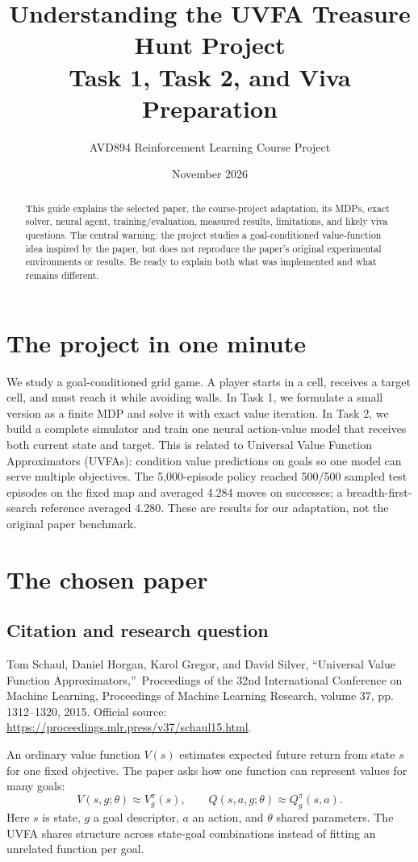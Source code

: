 \documentclass[11pt,a4paper]{article}
\title{Understanding the UVFA Treasure Hunt Project\\\large Task 1, Task 2, and Viva Preparation}
\author{AVD894 Reinforcement Learning Course Project}
\date{November 2026}
\begin{document}
\maketitle
\begin{abstract}
This guide explains the selected paper, the course-project adaptation, its MDPs, exact solver, neural agent, training/evaluation, measured results, limitations, and likely viva questions. The central warning: the project studies a goal-conditioned value-function idea inspired by the paper, but does not reproduce the paper's original experimental environments or results. Be ready to explain both what was implemented and what remains different.
\end{abstract}

\section{The project in one minute}
We study a goal-conditioned grid game. A player starts in a cell, receives a target cell, and must reach it while avoiding walls. In Task 1, we formulate a small version as a finite MDP and solve it with exact value iteration. In Task 2, we build a complete simulator and train one neural action-value model that receives both current state and target. This is related to Universal Value Function Approximators (UVFAs): condition value predictions on goals so one model can serve multiple objectives. The 5,000-episode policy reached 500/500 sampled test episodes on the fixed map and averaged 4.284 moves on successes; a breadth-first-search reference averaged 4.280. These are results for our adaptation, not the original paper benchmark.

\section{The chosen paper}

\subsection{Citation and research question}
Tom Schaul, Daniel Horgan, Karol Gregor, and David Silver, \textquotedblleft Universal Value Function Approximators,\textquotedblright\ Proceedings of the 32nd International Conference on Machine Learning, Proceedings of Machine Learning Research, volume 37, pp. 1312--1320, 2015. Official source: \url{https://proceedings.mlr.press/v37/schaul15.html}.

An ordinary value function $V(s)$ estimates expected future return from state $s$ for one fixed objective. The paper asks how one function can represent values for many goals:
\[
V(s,g;\theta)\approx V_g^\pi(s),\qquad Q(s,a,g;\theta)\approx Q_g^\pi(s,a).
\]
Here $s$ is state, $g$ a goal descriptor, $a$ an action, and $\theta$ shared parameters. The UVFA shares structure across state-goal combinations instead of fitting an unrelated function per goal.
\end{document}
